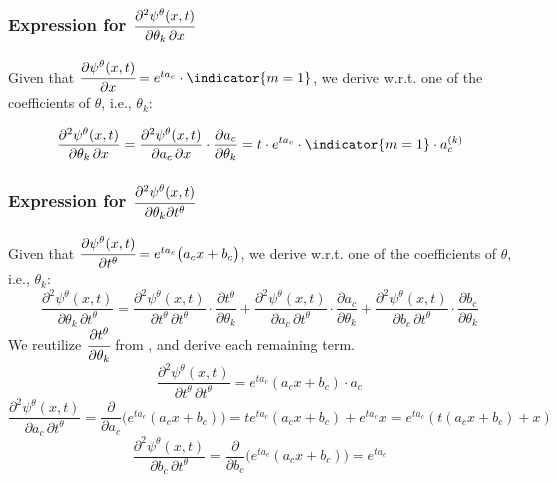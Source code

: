 \subsubsection{Expression for $\cfrac{\partial^2 \psi^\theta(x,t)}{\partial \theta_k \, \partial x}$}

Given that $\cfrac{\partial \psi^\theta(x,t)}{\partial x} = e^{t a_c} \cdot \indicator{m=1}$, we derive w.r.t. one of the coefficients of $\theta$, i.e., $\theta_k$:

\begin{equation}
\frac{\partial^2 \psi^\theta(x,t)}{\partial \theta_k \, \partial x} =
\frac{\partial^2 \psi^\theta(x,t)}{\partial a_c \, \partial x} \cdot \frac{\partial a_c}{\partial \theta_k} = 
t \cdot e^{t a_c} \cdot \indicator{m=1} \cdot a_c^{(k)} 
\end{equation}

\subsubsection{Expression for $\cfrac{\partial^2 \psi^\theta(x,t)}{\partial \theta_k \partial t^\theta}$}

Given that $\cfrac{\partial \psi^\theta(x,t)}{\partial t^\theta} = e^{t a_c} \big( a_c x + b_c \big)$, we derive w.r.t. one of the coefficients of $\theta$, i.e., $\theta_k$:
\begin{equation}\label{eq:derivative_phi_x_thetak}
  \frac{\partial^2 \psi^\theta(x,t)}{\partial \theta_k \, \partial t^\theta} =
  \frac{\partial^2 \psi^\theta(x,t)}{\partial {t^\theta} \, \partial t^\theta} \cdot \frac{\partial t^\theta}{\partial \theta_k} +
  \frac{\partial^2 \psi^\theta(x,t)}{\partial a_c \, \partial t^\theta} \cdot \frac{\partial a_c}{\partial \theta_k} +
  \frac{\partial^2 \psi^\theta(x,t)}{\partial b_c \, \partial t^\theta} \cdot \frac{\partial b_c}{\partial \theta_k}
\end{equation}
We reutilize $\cfrac{\partial t^\theta}{\partial \theta_k}$ from \cite{martinez2022closed}, and derive each remaining term.
\begin{equation}\label{eq:derivative_t_t}
\frac{\partial^2 \psi^\theta(x,t)}{\partial {t^\theta} \, \partial t^\theta} = 
e^{t a_c} ( a_c x + b_c) \cdot a_c
\end{equation}
\begin{equation}\label{eq:derivative_t_a}
\frac{\partial^2 \psi^\theta(x,t)}{\partial a_c \, \partial t^\theta} = 
\frac{\partial}{\partial a_c}\bigg( e^{t a_c} ( a_c x + b_c) \bigg) = 
t e^{t a_c} (a_c x + b_c) + e^{t a_c} x = 
e^{t a_c} (t(a_c x + b_c) + x)
\end{equation}
\begin{equation}\label{eq:derivative_t_b}
\frac{\partial^2 \psi^\theta(x,t)}{\partial b_c \, \partial t^\theta} = 
\frac{\partial}{\partial b_c}\bigg( e^{t a_c} ( a_c x + b_c) \bigg) = 
e^{t a_c} 
\end{equation}

